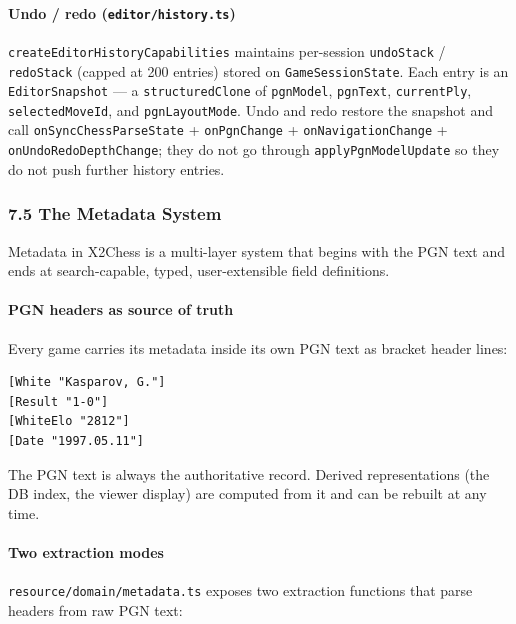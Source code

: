 \documentclass[]{article}
\let\oldparagraph\paragraph
\renewcommand{\paragraph}[1]{\oldparagraph{#1}\mbox{}}
\begin{document}
\paragraph{\texorpdfstring{Undo / redo
(\texttt{editor/history.ts})}{Undo / redo (editor/history.ts)}}\label{undo-redo-editorhistory.ts}

\texttt{createEditorHistoryCapabilities} maintains per-session
\texttt{undoStack} / \texttt{redoStack} (capped at 200 entries) stored
on \texttt{GameSessionState}. Each entry is an \texttt{EditorSnapshot}
--- a \texttt{structuredClone} of \texttt{pgnModel}, \texttt{pgnText},
\texttt{currentPly}, \texttt{selectedMoveId}, and
\texttt{pgnLayoutMode}. Undo and redo restore the snapshot and call
\texttt{onSyncChessParseState} + \texttt{onPgnChange} +
\texttt{onNavigationChange} + \texttt{onUndoRedoDepthChange}; they do
not go through \texttt{applyPgnModelUpdate} so they do not push further
history entries.

\subsubsection{7.5 The Metadata System}\label{the-metadata-system}

Metadata in X2Chess is a multi-layer system that begins with the PGN
text and ends at search-capable, typed, user-extensible field
definitions.

\paragraph{PGN headers as source of
truth}\label{pgn-headers-as-source-of-truth}

Every game carries its metadata inside its own PGN text as bracket
header lines:

\begin{verbatim}
[White "Kasparov, G."]
[Result "1-0"]
[WhiteElo "2812"]
[Date "1997.05.11"]
\end{verbatim}

The PGN text is always the authoritative record. Derived representations
(the DB index, the viewer display) are computed from it and can be
rebuilt at any time.

\paragraph{Two extraction modes}\label{two-extraction-modes}

\texttt{resource/domain/metadata.ts} exposes two extraction functions
that parse headers from raw PGN text:
\end{document}
